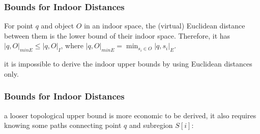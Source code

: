 
\begin{frame}
\frametitle{Bounds for Indoor Distances}


\vspace{10pt}
\begin{lemma}
  For point $q$ and object $O$ in an indoor space, the (virtual) Euclidean distance between them is the lower bound of their indoor space. Therefore, it has $|q,O|_{minE} \leq |q,O|_I$, where $|q, O|_{minE} = \min_{s_i \in O}|q,s_i|_E$.
\end{lemma}

\vspace{10pt}
\textrm{it is impossible to derive the indoor upper bounds by using Euclidean distances only.}

\end{frame}


\begin{frame}[allowframebreaks]
\frametitle{Bounds for Indoor Distances}


\begin{lemma}
\end{lemma}

\begin{lemma}
\end{lemma}

\textrm{a looser topological upper bound is more economic to be derived, it also requires knowing some paths connecting point $q$ and subregion $S[i]$}:

\begin{lemma}
\end{lemma}

\end{frame}

